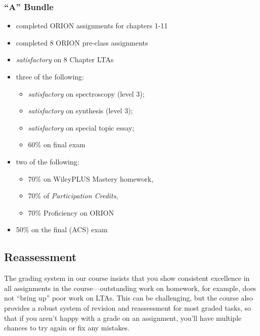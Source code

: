 \hypertarget{a-bundle}{%
\subsubsection{``A'' Bundle}\label{a-bundle}}

\begin{itemize}
\item
  completed ORION assignments for chapters 1-11
\item
  completed 8 ORION pre-class assignments
\item
  \emph{satisfactory} on 8 Chapter LTAs
\item
  three of the following:

  \begin{itemize}
  \tightlist
  \item
    \emph{satisfactory} on spectroscopy (level 3);
  \item
    \emph{satisfactory} on synthesis (level 3);
  \item
    \emph{satisfactory} on special topic essay;
  \item
    60\% on final exam
  \end{itemize}
\item
  two of the following:

  \begin{itemize}
  \tightlist
  \item
    70\% on WileyPLUS Mastery homework,
  \item
    70\% of \emph{Participation Credits},
  \item
    70\% Proficiency on ORION
  \end{itemize}
\item
  50\% on the final (ACS) exam
\end{itemize}

\hypertarget{revisions}{%
\subsection{Reassessment}\label{revisions}}

The grading system in our course insists that you show consistent
excellence in all assignments in the course---outstanding work on
homework, for example, does not ``bring up'' poor work on LTAs. This can
be challenging, but the course also provides a robust system of revision
and reassessment for most graded tasks, so that if you aren't happy with
a grade on an assignment, you'll have multiple chances to try again or
fix any mistakes.

